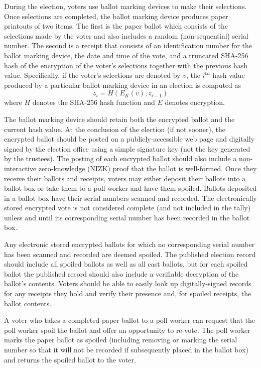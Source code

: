 During the election, voters use ballot marking devices to make their selections.  Once selections are completed, the ballot marking device produces paper printouts of two items.  The first is the paper ballot which consists of the selections made by the voter and also includes a random (non-sequential) serial number.  The second is a receipt that consists of an identification number for the ballot marking device, the date and time of the vote, and a truncated SHA-256 hash of the \elgamal encryption of the voter's selections together with the previous hash value.  Specifically, if the voter's selections are denoted by $v$, the $i^{\mathrm th}$ hash value produced by a particular ballot marking device in an election is computed as
\[
z_i=H(E_K(v),z_{i-1} )
\]
\noindent
where $H$ denotes the SHA-256 hash function and $E$ denotes \elgamal encryption.

The ballot marking device should retain both the encrypted ballot and the current hash value.  At the conclusion of the election (if not sooner), the encrypted ballot should be posted on a publicly-accessible web page and digitally signed by the election office using a simple signature key (not the key generated by the trustees).  The posting of each encrypted ballot should also include a non-interactive zero-knowledge (NIZK) proof that the ballot is well-formed.
Once they receive their ballots and receipts, voters may either deposit their ballots into a ballot box or take them to a poll-worker and have them spoiled.  Ballots deposited in a ballot box have their serial numbers scanned and recorded.  The electronically stored encrypted vote is not considered complete (and not included in the tally) unless and until its corresponding serial number has been recorded in the ballot box.

Any electronic stored encrypted ballots for which no corresponding serial number has been scanned and recorded are deemed spoiled.  The published election record should include all spoiled ballots as well as all cast ballots, but for each spoiled ballot the published record should also include a verifiable decryption of the ballot's contents.  Voters should be able to easily look up digitally-signed records for any receipts they hold and verify their presence and, for spoiled receipts, the ballot contents.

A voter who takes a completed paper ballot to a poll worker can request that the poll worker spoil the ballot and offer an opportunity to re-vote.  The poll worker marks the paper ballot as spoiled (including removing or marking the serial number so that it will not be recorded if subsequently placed in the ballot box) and returns the spoiled ballot to the voter.

